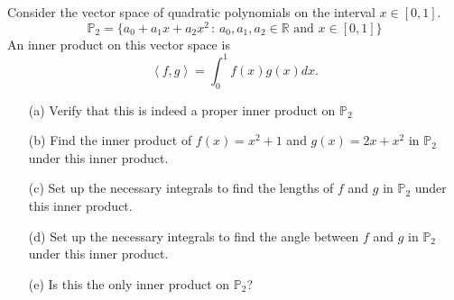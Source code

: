 \begin{problem}
    Consider the vector space of quadratic polynomials on the interval $x \in [0,1]$.
    \[ \mathbb{P}_2 = \{a_0 + a_1 x + a_2 x^2 \, : \, a_0, a_1, a_2 \in
        \mathbb{R} \text{ and } x \in [0,1] \} \]
    An inner product on this vector space is
    \[ \left< f,g\right> =
    \int_0^1 f(x) g(x) dx. \] 
    \begin{enumerate}
        \item[(a)] Verify that this is indeed a proper inner product on $\mathbb{P}_2$
        \item[(b)] Find the inner product of $f(x) = x^2+1$ and $g(x) =
            2x+x^2$ in $\mathbb{P}_2$ under this inner product.
        \item[(c)] Set up the necessary integrals to find the lengths of $f$ and $g$ in
            $\mathbb{P}_2$ under this inner product.
        \item[(d)] Set up the necessary integrals to find the angle between $f$ and $g$ in
            $\mathbb{P}_2$ under this inner product.
        \item[(e)] Is this the only inner product on $\mathbb{P}_2$?
    \end{enumerate}

\end{problem}


